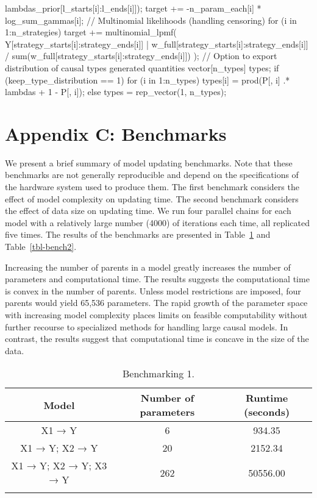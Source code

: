 \documentclass[
  11pt,
  article]{jss}
\begin{document}
\begin{CodeChunk}
\begin{CodeOutput}
{{                             lambdas_prior[l_starts[i]:l_ends[i]]);
    target += -n_param_each[i] * log_sum_gammas[i];
  }
  // Multinomial likelihoods (handling censoring)
  for (i in 1:n_strategies) {
    target += multinomial_lpmf(
      Y[strategy_starts[i]:strategy_ends[i]] |
      w_full[strategy_starts[i]:strategy_ends[i]] /
      sum(w_full[strategy_starts[i]:strategy_ends[i]])
    );
  }
}
// Option to export distribution of causal types
generated quantities {
  vector[n_types] types;
  if (keep_type_distribution == 1) {
    for (i in 1:n_types) {
      types[i] = prod(P[, i] .* lambdas + 1 - P[, i]);
    }
  } else {
    types = rep_vector(1, n_types);
  }
} 
\end{CodeOutput}
\end{CodeChunk}

\newpage{}

\section*{Appendix C: Benchmarks}\label{sec-benchmark}

We present a brief summary of model updating benchmarks. Note that these
benchmarks are not generally reproducible and depend on the
specifications of the hardware system used to produce them. The first
benchmark considers the effect of model complexity on updating time. The
second benchmark considers the effect of data size on updating time. We
run four parallel chains for each model with a relatively large number
(4000) of iterations each time, all replicated five times. The results
of the benchmarks are presented in Table~\ref{tbl-bench1} and
Table~\ref{tbl-bench2}.

Increasing the number of parents in a model greatly increases the number
of parameters and computational time. The results suggests the
computational time is convex in the number of parents. Unless model
restrictions are imposed, four parents would yield 65,536 parameters.
The rapid growth of the parameter space with increasing model complexity
places limits on feasible computability without further recourse to
specialized methods for handling large causal models. In contrast, the
results suggest that computational time is concave in the size of the
data.

\begin{longtable}{ccc}

\toprule
Model & Number of parameters & Runtime (seconds)\\
\midrule
X1 → Y & 6 & 934.35\\
X1 → Y; X2 → Y & 20 & 2152.34\\
X1 → Y; X2 → Y; X3 → Y & 262 & 50556.00\\
\bottomrule


\caption{\label{tbl-bench1}Benchmarking 1.}

\tabularnewline
\end{longtable}
\end{document}
